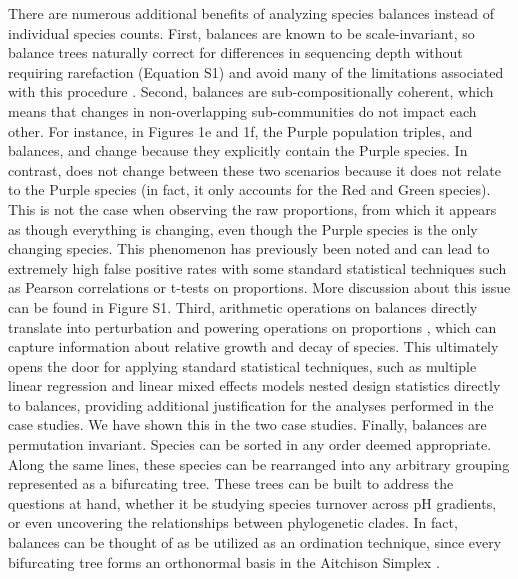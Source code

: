  There are numerous additional benefits of analyzing species balances instead of individual species counts.  First, balances are known to be scale-invariant, so balance trees naturally correct for differences in sequencing depth without requiring rarefaction (Equation S1) and avoid many of the limitations associated with this procedure \cite{waste_not}. Second, balances are sub-compositionally coherent, which means that changes in non-overlapping sub-communities do not impact each other.  For instance, in Figures 1e and 1f, the Purple population triples, and balances, and change because they explicitly contain the Purple species.  In contrast, does not change between these two scenarios because it does not relate to the Purple species (in fact, it only accounts for the Red and Green species).  This is not the case when observing the raw proportions, from which it appears as though everything is changing, even though the Purple species is the only changing species.  This phenomenon has previously been noted \cite{ancom} and can lead to extremely high false positive rates with some standard statistical techniques such as Pearson correlations or t-tests on proportions.  More discussion about this issue can be found in Figure S1. Third, arithmetic operations on balances directly translate into perturbation and powering operations on proportions \cite{ilr, Pawlowsky-Glahn2015-qb}, which can capture information about relative growth and decay of species.  This ultimately opens the door for applying standard statistical techniques, such as multiple linear regression \cite{c24} and linear mixed effects models nested design statistics directly to balances, providing additional justification for the analyses performed in the case studies.  We have shown this in the two case studies.  Finally, balances are permutation invariant.  Species can be sorted in any order deemed appropriate.  Along the same lines, these species can be rearranged into any arbitrary grouping represented as a bifurcating tree.  These trees can be built to address the questions at hand, whether it be studying species turnover across pH gradients, or even uncovering the relationships between phylogenetic clades.  In fact, balances can be thought of as be utilized as an ordination technique, since every bifurcating tree forms an orthonormal basis in the Aitchison Simplex \cite{groups_of_parts}.\par
